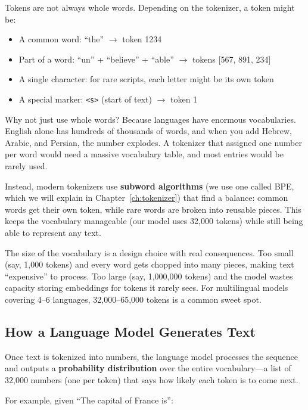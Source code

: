 \documentclass[11pt,a4paper]{article}
\begin{document}
Tokens are not always whole words. Depending on the tokenizer, a token might be:

\begin{itemize}
    \item A common word: ``the'' $\rightarrow$ token 1234
    \item Part of a word: ``un'' + ``believe'' + ``able'' $\rightarrow$ tokens [567, 891, 234]
    \item A single character: for rare scripts, each letter might be its own token
    \item A special marker: \texttt{<s>} (start of text) $\rightarrow$ token 1
\end{itemize}

Why not just use whole words? Because languages have enormous vocabularies. English alone has hundreds of thousands of words, and when you add Hebrew, Arabic, and Persian, the number explodes. A tokenizer that assigned one number per word would need a massive vocabulary table, and most entries would be rarely used.

Instead, modern tokenizers use \textbf{subword algorithms} (we use one called BPE, which we will explain in Chapter~\ref{ch:tokenizer}) that find a balance: common words get their own token, while rare words are broken into reusable pieces. This keeps the vocabulary manageable (our model uses 32,000 tokens) while still being able to represent any text.

\begin{tip}
The size of the vocabulary is a design choice with real consequences. Too small (say, 1,000 tokens) and every word gets chopped into many pieces, making text ``expensive'' to process. Too large (say, 1,000,000 tokens) and the model wastes capacity storing embeddings for tokens it rarely sees. For multilingual models covering 4--6 languages, 32,000--65,000 tokens is a common sweet spot.
\end{tip}

\subsection{How a Language Model Generates Text}

Once text is tokenized into numbers, the language model processes the sequence and outputs a \textbf{probability distribution} over the entire vocabulary---a list of 32,000 numbers (one per token) that says how likely each token is to come next.

For example, given ``The capital of France is'':
\end{document}
